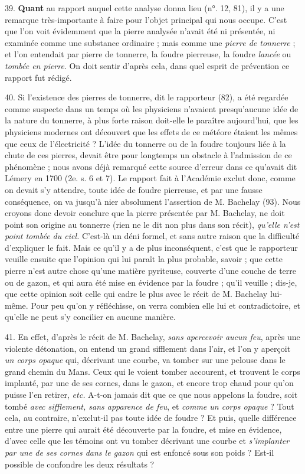\documentclass[a4paper, 11pt, oneside, polutonikogreek, french]{article}
\begin{document}
39. \textbf{Quant} au rapport auquel cette analyse donna lieu (n°. 12, 81), il y a une remarque très-importante à faire pour l'objet principal qui nous occupe. C'est que l'on voit évidemment que la pierre analysée n'avait été ni présentée, ni examinée comme une substance ordinaire ; mais comme une \emph{pierre de tonnerre} ; et l'on entendait par pierre de tonnerre, la foudre pierreuse, la foudre \emph{lancée} ou \emph{tombée en pierre}. On doit sentir d'après cela, dans quel esprit de prévention ce rapport fut rédigé.

40. \og Si l'existence des pierres de tonnerre, dit le rapporteur (82), a été regardée comme suspecte dans un temps où les physiciens n'avaient presqu'aucune idée de la nature du tonnerre, à plus forte raison doit-elle le paraître aujourd'hui, que les physiciens modernes ont découvert que les effets de ce météore étaient les mêmes que ceux de l'électricité ? \fg L'idée du tonnerre ou de la foudre toujours liée à la chute de ces pierres, devait être pour longtemps un obstacle à l'admission de ce phénomène ; nous avons déjà remarqué cette source d'erreur dans ce qu'avait dit Lémery en 1700 (2e. s. 6 et 7). Le rapport fait à l'Académie exclut donc, comme on devait s'y attendre, toute idée de foudre pierreuse, et par une fausse conséquence, on va jusqu'à nier absolument l'assertion de M. Bachelay (93). \og Nous croyons donc devoir conclure que la pierre présentée par M. Bachelay, ne doit point son origine au tonnerre (rien ne le dit non plus dans son récit), \emph{qu'elle n'est point tombée du ciel.} \fg C'est-là un déni formel, et sans autre raison que la difficulté d'expliquer le fait. Mais ce qu'il y a de plus inconséquent, c'est que le rapporteur veuille ensuite que l'opinion qui lui paraît la plus probable, savoir ; que cette pierre n'est autre chose qu'une matière pyriteuse, couverte d'une couche de terre ou de gazon, et qui aura été mise en évidence par la foudre ; qu'il veuille ; dis-je, que cette opinion soit celle qui cadre le plus avec le récit de M. Bachelay lui-même. Pour peu qu'on y réfléchisse, on verra combien elle lui et contradictoire, et qu'elle ne peut s'y concilier en aucune manière.

41. En effet, d'après le récit de M. Bachelay, \og \emph{sans apercevoir aucun feu}, après une violente détonation, on entend un grand sifflement dans l'air, et l'on y aperçoit \emph{un corps opaque} qui, décrivant une courbe, va tomber sur une pelouse dans le grand chemin du Mans. Ceux qui le voient tomber accourent, et trouvent le corps implanté, par une de ses cornes, dans le gazon, et encore trop chaud pour qu'on puisse l'en retirer, \emph{etc.} A-t-on jamais dit que ce que nous appelons la foudre, soit tombé \emph{avec sifflement, sans apparence de feu}, et \emph{comme un corps opaque} ? Tout cela, au contraire, n'exclut-il pas toute idée de foudre ? Et puis, quelle différence entre une pierre qui aurait été découverte par la foudre, et mise en évidence, d'avec celle que les témoins ont vu tomber décrivant une courbe et \emph{s'implanter par une de ses cornes dans le gazon} qui est enfoncé sous son poids ? Est-il possible de confondre les deux résultats ? \fg
\end{document}
